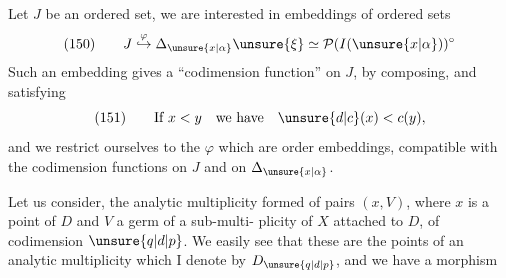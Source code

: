 Let $J$ be an ordered set, we are interested in embeddings of ordered sets
\[
(150)\qquad J\mathrel{\overset{\varphi}{\hookrightarrow}}\Delta_{\unsure{x|\alpha}}\unsure{\xi}\simeq\mathcal P(I(\unsure{x|\alpha}))^\circ
\]
Such an embedding gives a ``codimension function'' on $J$, by composing,  and  satisfying
\[
(151)\qquad\text{If }x<y\quad\text{we have}\quad\unsure{d|c}(x)<c(y),
\]
and we restrict ourselves to the $\varphi$ which are order embeddings, compatible with the codimension functions on $J$ and on $\Delta_{\unsure{x|\alpha}}$.

Let us consider,  the analytic multiplicity formed of pairs $(x,V)$, where $x$ is a point of $D$ and $V$ a germ of a sub-multi-
plicity of $X$ attached to $D$, of codimension $\unsure{q|d|p}$. We  easily see that these are  the points of an analytic multiplicity which I denote by $D_{\unsure{q|d|p}}$, and we have a morphism
